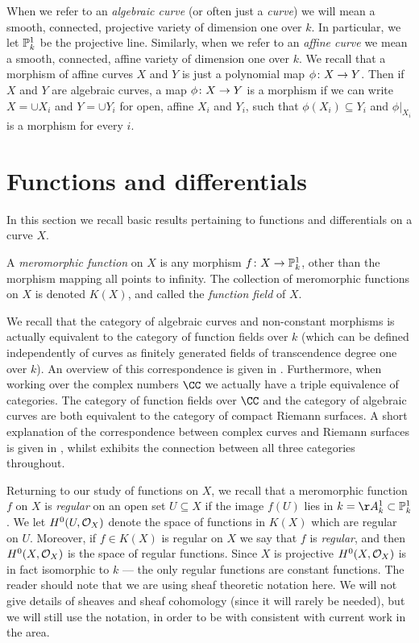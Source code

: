 When we refer to an \emph{algebraic curve} (or often just a \emph{curve}) we will mean a smooth, connected, projective variety of dimension one over $k$.
In particular, we let ${\mathbb P}_k^1$ be the projective line.
Similarly, when we refer to an \emph{affine curve} we mean a smooth, connected, affine variety of dimension one over $k$. %
We recall that a morphism of affine curves $X$ and $Y$ is just a polynomial map $\phi \colon X \rightarrow Y$.
Then if $X$ and $Y$ are algebraic curves, a map $\phi \colon X \rightarrow Y$ is a morphism if we can write $X = \cup X_i$ and $Y = \cup Y_i$ for open, affine $X_i$ and $Y_i$, such that $\phi(X_i) \subseteq Y_i$ and $\phi|_{X_i}$ is a morphism for every $i$.



\section{Functions and differentials}

In this section we recall basic results pertaining to functions and differentials on a curve $X$. 

A \emph{meromorphic function} on $X$ is any morphism $f \colon X \rightarrow {\mathbb P}_k^1$, other than the morphism mapping all points to infinity.
The collection of meromorphic functions on $X$ is denoted $K(X)$, and called the \emph{function field} of $X$.

We recall that the category of algebraic curves and non-constant morphisms is actually equivalent to the category of function fields over $k$ (which can be defined independently of curves as finitely generated fields of transcendence degree one over $k$).
An overview of this correspondence is given in \cite[Appendix B]{stichtenoth}.
Furthermore, when working over the complex numbers $\CC$ we actually have a triple equivalence of categories.
The category of function fields over $\CC$ and the category of algebraic curves are both equivalent to the category of compact Riemann surfaces. 
A short explanation of the correspondence between complex curves and Riemann surfaces is given in \cite[Chap.\ 1, \S 2]{griffiths}, whilst \cite{miranda} exhibits the connection between all three categories throughout.


Returning to our study of functions on $X$, we recall that a meromorphic function $f$ on $X$ is \emph{regular} on an open set $U \subseteq X$ if the image $f(U)$ lies in $k = \AA_k^1 \subset \PP_k^1$.
We let $H^0(U,{\cal O}_X)$ denote the space of functions in $K(X)$ which are regular on $U$.
Moreover, if $f \in K(X)$ is regular on $X$ we say that $f$ is \emph{regular}, and then $H^0(X,{\cal O}_X)$ is the space of regular functions.
Since $X$ is projective $H^0(X,{\cal O}_X)$ is in fact isomorphic to $k$ --- \ie the only regular functions are constant functions.
The reader should note that we are using sheaf theoretic notation here. 
We will not give details of sheaves and sheaf cohomology (since it will rarely be needed), but we will still use the notation, in order to be with consistent with current work in the area.

